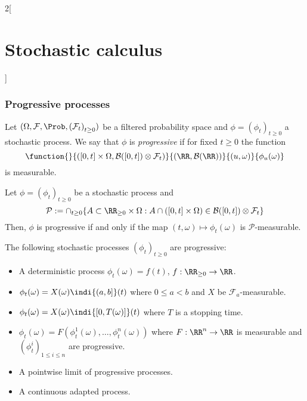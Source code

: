 \documentclass[../../../main_math.tex]{subfiles}
\begin{document}
\begin{multicols}{2}[\section{Stochastic calculus}]
  \subsubsection{Progressive processes}
  \begin{definition}
    Let $(\Omega,\mathcal{F},\Prob,{(\mathcal{F}_t)}_{t\geq 0})$ be a filtered probability space and $\phi={(\phi_t)}_{t\geq 0}$ a stochastic process. We say that $\phi$ is \emph{progressive} if for fixed $t\geq 0$ the function
    $$
      \function{}{([0,t]\times \Omega,\mathcal{B}([0,t])\otimes \mathcal{F}_t)}{(\RR,\mathcal{B}(\RR))}{(u,\omega)}{\phi_u(\omega)}
    $$
    is measurable.
  \end{definition}
  \begin{lemma}
    Let $\phi={(\phi_t)}_{t\geq 0}$ be a stochastic process and
    $$
      \mathcal{P}:=\cap_{t\geq 0}\{ A\subset \RR_{\geq 0}\times\Omega:A\cap([0,t]\times\Omega)\in \mathcal{B}([0,t])\otimes \mathcal{F}_t\}
    $$
    Then, $\phi$ is progressive if and only if the map $(t,\omega)\mapsto\phi_t(\omega)$ is $\mathcal{P}$-measurable.
  \end{lemma}
  \begin{proposition}
    The following stochastic processes ${(\phi_t)}_{t\geq 0}$ are progressive:
    \begin{itemize}
      \item A deterministic process $\phi_t(\omega)=f(t)$, $f:\RR_{\geq 0}\to\RR$.
      \item $\phi_t(\omega)=X(\omega)\indi{(a,b]}(t)$ where $0\leq a<b$ and $X$ be $\mathcal{F}_a$-measurable.
      \item $\phi_t(\omega)=X(\omega)\indi{[0,T(\omega)]}(t)$ where $T$ is a stopping time.
      \item $\phi_t(\omega)=F(\phi_t^1(\omega),\ldots,\phi_t^n(\omega))$ where $F:\RR^n\to\RR$ is measurable and ${(\phi_t^i)}_{1\leq i\leq n}$ are progressive.
      \item A pointwise limit of progressive processes.
      \item A continuous adapted process.
    \end{itemize}
  \end{proposition}

\end{multicols}
\end{document}
